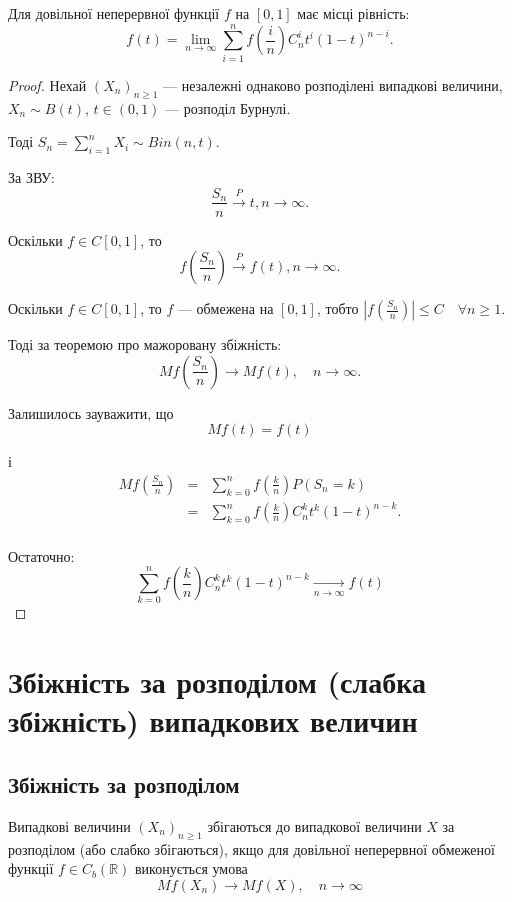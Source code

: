 \begin{theorem}
    Для довільної неперервної функції $f$ на $[0, 1]$
    має місці рівність:
    $$f(t) = \lim\limits_{n \rightarrow \infty} \sum\limits_{i=1}^n f(\frac{i}{n}) C_n^i t^i (1-t)^{n-i}.$$
\end{theorem}
\begin{proof}
    Нехай $(X_n)_{n \geqslant 1}$ --- незалежні однаково розподілені
    випадкові величини, $X_n \sim B(t)$, $t \in (0, 1)$ --- розподіл
    Бурнулі.
    
    Тоді $S_n = \sum\limits_{i=1}^{n} X_i \sim Bin(n, t).$
    
    За ЗВУ:
    $$\frac{S_n}{n} \xrightarrow{P} t, n \rightarrow \infty.$$
    
    Оскільки $f \in C[0, 1]$, то
    $$f(\frac{S_n}{n}) \xrightarrow{P} f(t), n \rightarrow \infty.$$
    
    Оскільки $f \in C[0, 1]$, то $f$ --- обмежена на $[0, 1]$, тобто
    $|f(\frac{S_n}{n})| \leqslant C \quad \forall n \geqslant 1.$
    
    Тоді за теоремою про мажоровану збіжність:
    $$Mf(\frac{S_n}{n}) \rightarrow Mf(t), \quad n \rightarrow \infty.$$
    
    Залишилось зауважити, що 
    $$Mf(t) = f(t)$$
    
    і
    $$\begin{array}{rcl}
        Mf(\frac{S_n}{n}) & = & \sum\limits_{k=0}^{n} f(\frac{k}{n}) P(S_n = k) \\
        & = & \sum\limits_{k=0}^{n} f(\frac{k}{n}) C_n^k t^k (1-t)^{n-k}. \\
    \end{array}$$
    
    Остаточно:
    $$\sum\limits_{k=0}^{n} f(\frac{k}{n}) C_n^k t^k (1-t)^{n-k} \xrightarrow[n \rightarrow \infty]{} f(t)$$
\end{proof}

\section{Збіжність за розподілом (слабка збіжність) випадкових величин}

\subsection{Збіжність за розподілом}

\begin{definition}
\end{definition}
Випадкові величини $(X_n)_{n \geqslant 1}$ збігаються до
випадкової величини $X$ за розподілом (або слабко збігаються),
якщо для довільної неперервної обмеженої функції $f \in C_b(\mathbb{R})$
виконується умова
\begin{equation}
    \label{convergence_by_distribution}
    Mf(X_n) \rightarrow Mf(X), \quad n \rightarrow \infty
\end{equation}

